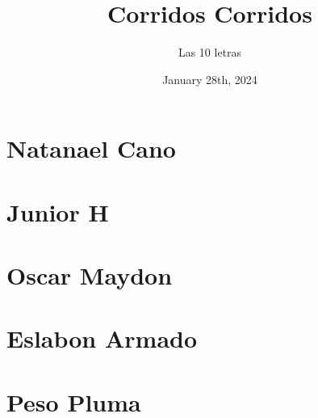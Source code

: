 \documentclass{article}
\title{Corridos Corridos}
\date{January 28th, 2024}
\author{Las 10 letras}
\begin{document}
\maketitle{}
\tableofcontents

\renewcommand\guitarPreAccord{\color{amaranth}\footnotesize\strut\bfseries}

%
\newpage
\section{Natanael Cano}

















\section{Junior H}












\section{Oscar Maydon}


\section{Eslabon Armado}





\section{Peso Pluma}	



\end{document}
